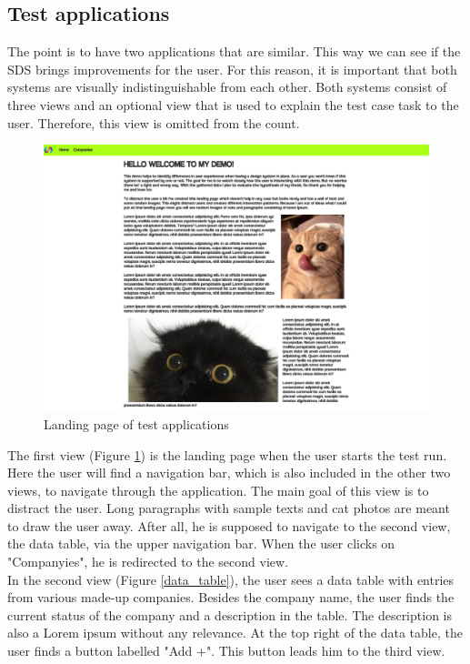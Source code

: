 \newpage
\subsection{Test applications}
The point is to have two applications that are similar. This way we can see if the SDS brings improvements for the user. For this reason, it is important that both systems are visually indistinguishable from each other. Both systems consist of three views and an optional view that is used to explain the test case task to the user. Therefore, this view is omitted from the count. \\

\begin{figure}[hbtp]
    \centerline{\includegraphics[width=\linewidth, draft=false]{images/demo_view_landing_page.png}}
    \caption{Landing page of test applications}
    \label{landing_page}
\end{figure}
The first view (Figure \ref{landing_page}) is the landing page when the user starts the test run. Here the user will find a navigation bar, which is also included in the other two views, to navigate through the application. The main goal of this view is to distract the user. Long paragraphs with sample texts and cat photos are meant to draw the user away. After all, he is supposed to navigate to the second view, the data table, via the upper navigation bar. When the user clicks on "Companyies", he is redirected to the second view. \\
\newpage
In the second view (Figure \ref{data_table}), the user sees a data table with entries from various made-up companies. Besides the company name, the user finds the current status of the company and a description in the table. The description is also a Lorem ipsum without any relevance. At the top right of the data table, the user finds a button labelled "Add +". This button leads him to the third view. \\

